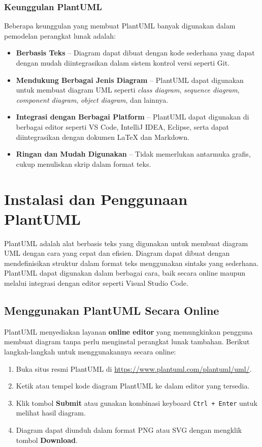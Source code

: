 \subsubsection{Keunggulan PlantUML}
Beberapa keunggulan yang membuat PlantUML banyak digunakan dalam pemodelan perangkat lunak adalah:
\begin{itemize}
	\item \textbf{Berbasis Teks} – Diagram dapat dibuat dengan kode sederhana yang dapat dengan mudah diintegrasikan dalam sistem kontrol versi seperti Git.
	\item \textbf{Mendukung Berbagai Jenis Diagram} – PlantUML dapat digunakan untuk membuat diagram UML seperti \textit{class diagram}, \textit{sequence diagram}, \textit{component diagram}, \textit{object diagram}, dan lainnya.
	\item \textbf{Integrasi dengan Berbagai Platform} – PlantUML dapat digunakan di berbagai editor seperti VS Code, IntelliJ IDEA, Eclipse, serta dapat diintegrasikan dengan dokumen LaTeX dan Markdown.
	\item \textbf{Ringan dan Mudah Digunakan} – Tidak memerlukan antarmuka grafis, cukup menuliskan skrip dalam format teks.
\end{itemize}

\section{Instalasi dan Penggunaan PlantUML}

PlantUML adalah alat berbasis teks yang digunakan untuk membuat diagram UML dengan cara yang cepat dan efisien. Diagram dapat dibuat dengan mendefinisikan struktur dalam format teks menggunakan sintaks yang sederhana. PlantUML dapat digunakan dalam berbagai cara, baik secara online maupun melalui integrasi dengan editor seperti Visual Studio Code.

\subsection{Menggunakan PlantUML Secara Online}

PlantUML menyediakan layanan \textbf{online editor} yang memungkinkan pengguna membuat diagram tanpa perlu menginstal perangkat lunak tambahan. Berikut langkah-langkah untuk menggunakannya secara online:

\begin{enumerate}
	\item Buka situs resmi PlantUML di \url{https://www.plantuml.com/plantuml/uml/}.
	\item Ketik atau tempel kode diagram PlantUML ke dalam editor yang tersedia.
	\item Klik tombol \textbf{Submit} atau gunakan kombinasi keyboard \texttt{Ctrl + Enter} untuk melihat hasil diagram.
	\item Diagram dapat diunduh dalam format PNG atau SVG dengan mengklik tombol \textbf{Download}.
\end{enumerate}

